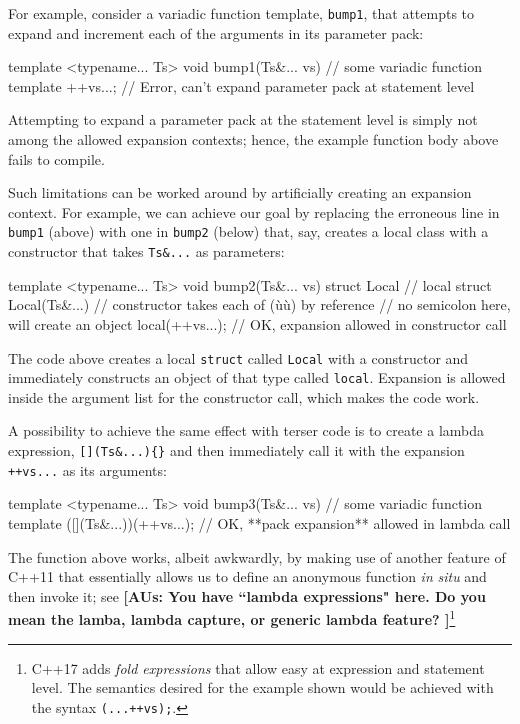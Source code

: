 For example, consider a variadic function template, \lstinline!bump1!, that
attempts to expand and increment each of the arguments in its parameter
pack:

\begin{emcppslisting}
template <typename... Ts>
void bump1(Ts&... vs)  // some variadic function template
{
    ++vs...;           // Error, can't expand parameter pack at statement level
}
\end{emcppslisting}
    

\noindent Attempting to expand a parameter pack at the statement level is simply
not among the allowed expansion contexts; hence, the example function
body above fails to compile.

Such limitations can be worked around by artificially creating an
expansion context. For example, we can achieve our goal by replacing the
erroneous line in \lstinline!bump1! (above) with one in \lstinline!bump2!
(below) that, say, creates a local class with a constructor that takes
\lstinline!Ts&...! as parameters:

\begin{emcppslisting}
template <typename... Ts>
void bump2(Ts&... vs)
{
    struct Local          // local struct
    {
        Local(Ts&...) {}  // constructor takes each of (ù{}ù) by reference
    }                     // no semicolon here, will create an object
    local(++vs...);       // OK, expansion allowed in constructor call
}
\end{emcppslisting}
    

\noindent The code above creates a local \lstinline!struct! called \lstinline!Local!
with a constructor and immediately constructs an object of that type
called \lstinline!local!. Expansion is allowed inside the argument list for
the constructor call, which makes the code work.

A possibility to achieve the same effect with terser code is to create a
lambda expression, \lstinline![](Ts&...){}! and then immediately call it
with the expansion \lstinline!++vs...! as its arguments:

\begin{emcppslisting}
template <typename... Ts>
void bump3(Ts&... vs)          // some variadic function template
{
     ([](Ts&...){})(++vs...);  // OK, **pack expansion** allowed in lambda call
}
\end{emcppslisting}
    

\noindent The function above works, albeit awkwardly, by making use of another
feature of C++11 that essentially allows us to define an anonymous
function \emph{in} \emph{situ} and then invoke it; see
\featureref{}{} \textbf{[AUs: You have ``lambda expressions" here. Do you mean the lamba, lambda capture, or generic lambda feature? ]}{\cprotect\footnote{C++17 adds \emph{fold expressions} that allow easy 
  at expression and statement level. The semantics desired for the
  example shown would be achieved with the syntax \lstinline!(...++vs);!.}}

